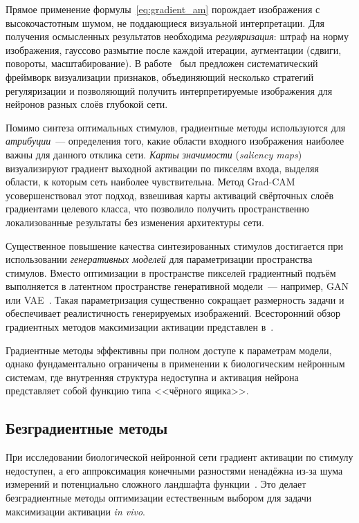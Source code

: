 Прямое применение формулы~\eqref{eq:gradient_am} порождает изображения с высокочастотным шумом, не поддающиеся визуальной интерпретации. Для получения осмысленных результатов необходима \textit{регуляризация}: штраф на норму изображения, гауссово размытие после каждой итерации, аугментации (сдвиги, повороты, масштабирование). В работе~\cite{Olah2017} был предложен систематический фреймворк визуализации признаков, объединяющий несколько стратегий регуляризации и позволяющий получить интерпретируемые изображения для нейронов разных слоёв глубокой сети.

Помимо синтеза оптимальных стимулов, градиентные методы используются для \textit{атрибуции}~--- определения того, какие области входного изображения наиболее важны для данного отклика сети. \textit{Карты значимости} (\textit{saliency maps})~\cite{Simonyan2014} визуализируют градиент выходной активации по пикселям входа, выделяя области, к которым сеть наиболее чувствительна. Метод Grad-CAM~\cite{Selvaraju2017} усовершенствовал этот подход, взвешивая карты активаций свёрточных слоёв градиентами целевого класса, что позволило получить пространственно локализованные результаты без изменения архитектуры сети.

Существенное повышение качества синтезированных стимулов достигается при использовании \textit{генеративных моделей} для параметризации пространства стимулов. Вместо оптимизации в пространстве пикселей градиентный подъём выполняется в латентном пространстве генеративной модели~--- например, GAN~\cite{GANpaper} или VAE~\cite{VAE-vanilla-Kingma-Welling}. Такая параметризация существенно сокращает размерность задачи и обеспечивает реалистичность генерируемых изображений. Всесторонний обзор градиентных методов максимизации активации представлен в~\cite{Nguyen2019}.

Градиентные методы эффективны при полном доступе к параметрам модели, однако фундаментально ограничены в применении к биологическим нейронным системам, где внутренняя структура недоступна и активация нейрона представляет собой функцию типа <<чёрного ящика>>.

\subsection{Безградиентные методы}\label{sec:gradfree_am}

При исследовании биологической нейронной сети градиент активации по стимулу недоступен, а его аппроксимация конечными разностями ненадёжна из-за шума измерений и потенциально сложного ландшафта функции~\cite{Pospelov2025}. Это делает безградиентные методы оптимизации естественным выбором для задачи максимизации активации \textit{in vivo}.

